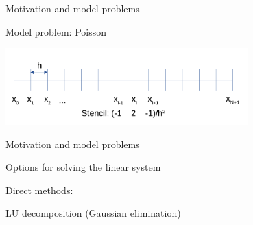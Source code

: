 \documentclass[18pt,xcolor=table]{beamer}
\begin{document}
\begin{frame}{Motivation and model problems}
\begin{block}{Model problem: Poisson}
\begin{center}
\includegraphics[width=0.7\textwidth]{../figures/1DFDPoisson}
\end{center}
\end{block}

\end{frame}

\begin{frame}{Motivation and model problems}
\begin{block}{Options for solving the linear system}
\bit
\item Direct methods:
\bit
\item LU decomposition (Gaussian elimination)
\item 
\eit
\eit
\end{block}

\end{frame}
\end{document}
